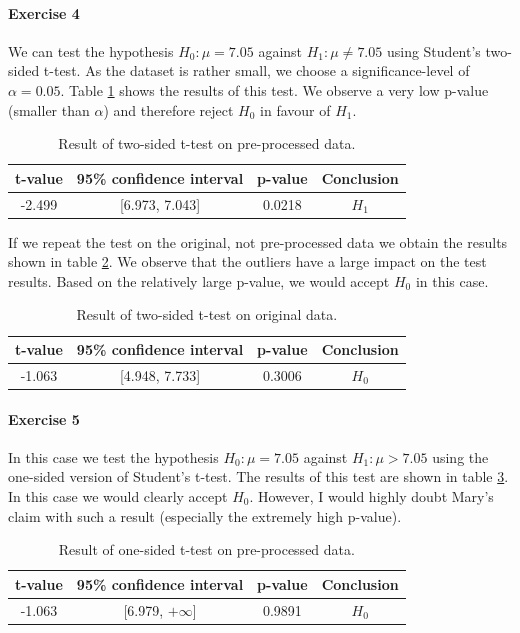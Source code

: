 \documentclass{paper}
\begin{document}
\paragraph{Exercise 4}
We can test the hypothesis $H_0: \mu = 7.05$ against $H_1: \mu \neq 7.05$ using Student's two-sided t-test. As the dataset is rather small, we choose a significance-level of $\alpha=0.05$. Table \ref{tab:t2proc} shows the results of this test. We observe a very low p-value (smaller than $\alpha$) and therefore reject $H_0$ in favour of $H_1$. 

\begin{table}[h]
\centering
\caption{Result of two-sided t-test on pre-processed data.}
\label{tab:t2proc}
\begin{tabular}{|c|c|c|c|}
\hline
t-value & 95\% confidence interval & p-value & Conclusion \\ \hline
-2.499 & {[}6.973, 7.043{]} & 0.0218 & $H_1$      \\ \hline
\end{tabular}
\end{table}

If we repeat the test on the original, not pre-processed data we obtain the results shown in table \ref{tab:t2orig}. We observe that the outliers have a large impact on the test results. Based on the relatively large p-value, we would accept $H_0$ in this case. 

\begin{table}[h]
\centering
\caption{Result of two-sided t-test on original data.}
\label{tab:t2orig}
\begin{tabular}{|c|c|c|c|}
\hline
t-value & 95\% confidence interval & p-value & Conclusion \\ \hline
-1.063 & {[}4.948, 7.733{]} & 0.3006 & $H_0$      \\ \hline
\end{tabular}
\end{table}

\paragraph{Exercise 5}
In this case we test the hypothesis $H_0: \mu = 7.05$ against $H_1: \mu > 7.05$ using the one-sided version of Student's t-test. The results of this test are shown in table \ref{tab:t1}. In this case we would clearly accept $H_0$. However, I would highly doubt Mary's claim with such a result (especially the extremely high p-value). 

\begin{table}[h]
\centering
\caption{Result of one-sided t-test on pre-processed data.}
\label{tab:t1}
\begin{tabular}{|c|c|c|c|}
\hline
t-value & 95\% confidence interval & p-value & Conclusion \\ \hline
-1.063 & {[}6.979, $+\infty${]} & 0.9891 & $H_0$      \\ \hline
\end{tabular}
\end{table}


 
\end{document}
